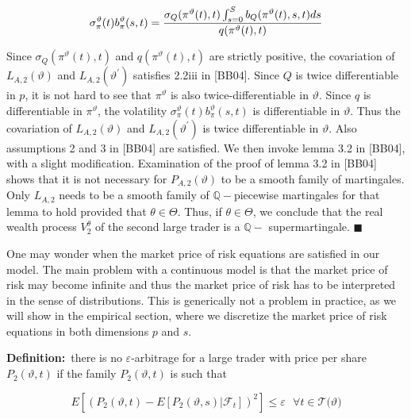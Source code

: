 \documentclass{article}
\begin{document}
\begin{equation*}
\sigma _{\pi }^{\vartheta }(t)b_{\pi }^{\vartheta }(s,t)=\frac{\sigma
_{Q}(\pi ^{\vartheta }(t),t)\int_{s=0}^{S}b_{Q}(\pi ^{\vartheta }(t),s,t)ds}{%
q(\pi ^{\vartheta }(t),t)}
\end{equation*}

Since $\sigma _{Q}(\pi ^{\vartheta }(t),t)$ and $q(\pi ^{\vartheta }(t),t)$
are strictly positive, the covariation of $L_{A,2}(\vartheta )$ and $%
L_{A,2}(\vartheta ^{\prime })$ satisfies 2.2iii in [BB04]. Since $Q$ is
twice differentiable in $p$, it is not hard to see that $\pi ^{\vartheta }$
is also twice-differentiable in $\vartheta $. Since $q$ is differentiable in 
$\pi ^{\vartheta }$, the volatility $\sigma _{\pi }^{\vartheta }(t)b_{\pi
}^{\vartheta }(s,t)$ is differentiable in $\vartheta $. Thus the covariation
of $L_{A,2}(\vartheta )$ and $L_{A,2}(\vartheta ^{\prime })$ is twice
differentiable in $\vartheta $. Also assumptions 2 and 3 in [BB04] are
satisfied. We then invoke lemma 3.2 in [BB04], with a slight modification.
Examination of the proof of lemma 3.2 in [BB04] shows that it is not
necessary for $P_{A,2}(\vartheta )$ to be a smooth family of martingales.
Only $L_{A,2}$ needs to be a smooth family of $\mathbb{Q}-$piecewise
martingales for that lemma to hold provided that $\theta \in \Theta $. Thus,
if $\theta \in \Theta $, we conclude that the real wealth process $%
V_{2}^{\theta }$ of the second large trader is a $\mathbb{Q-}$
supermartingale. $\blacksquare $

\bigskip

One may wonder when the market price of risk equations are satisfied in our
model. The main problem with a continuous model is that the market price of
risk may become infinite and thus the market price of risk has to be
interpreted in the sense of distributions. This is generically not a problem
in practice, as we will show in the empirical section, where we discretize
the market price of risk equations in both dimensions $p$ and $s$.

\bigskip

\textbf{Definition:}\ there is no $\varepsilon $-arbitrage for a large
trader with price per share $P_{2}(\vartheta ,t)$ if the family $%
P_{2}(\vartheta ,t)$ is such that

\begin{equation*}
E[(P_{2}(\vartheta ,t)-E[P_{2}(\vartheta ,s)|\mathcal{F}_{t}])^{2}]\leq
\varepsilon \text{ \ \ \ }\forall t\in \mathcal{T(}\vartheta )
\end{equation*}
\end{document}
